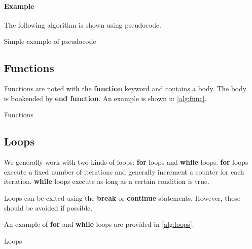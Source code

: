 \paragraph{Example} The following algorithm is shown using pseudocode.


\begin{algorithm}[H]
\caption{Simple example of pseudocode}\label{alg:exp}
\begin{algorithmic}
	\EndIf{}
\end{algorithmic}
\end{algorithm}

\subsection{Functions}
Functions are noted with the \textbf{function} keyword and contains a body. The body is bookended by \textbf{end function}. An example is shown in \autoref{alg:func}.

\begin{algorithm}[H]
	\caption{Functions}\label{alg:func}
	\begin{algorithmic}
			\EndIf{}		
		\EndFunction{}
	\end{algorithmic}
\end{algorithm}


\subsection{Loops}

We generally work with two kinds of loops: \textbf{for} loops and \textbf{while} loops. \textbf{for} loops execute a fixed number of iterations and generally increment a counter for each iteration. \textbf{while} loops execute as long as a certain condition is true.

Loops can be exited using the \textbf{break} or \textbf{continue} statements. However, these should be avoided if possible.

An example of \textbf{for} and \textbf{while} loops are provided in \autoref{alg:loops}.

\begin{algorithm}[H]
	\caption{Loops}\label{alg:loops}
	\begin{algorithmic}
		\State{\(x \leftarrow 1\)}
		\For{\(2 \leq i \leq 10\)}
		\State{\(x \leftarrow x + i\)}
		\EndFor{}
		\State{\(x \leftarrow 1\) }
		\State{\(y \leftarrow 0\)}
		\While{\(x < 11\)}
		\State{\(x \leftarrow x + y\)}
		\EndWhile{}
	\end{algorithmic}
\end{algorithm}

